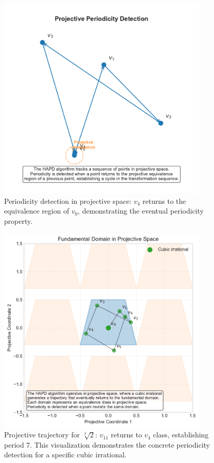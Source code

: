 \begin{theorem}
\begin{figure}[htbp]
\centering
\includegraphics[width=0.9\textwidth]{figures/output/projective_periodicity_visualization.pdf}
\caption{Periodicity detection in projective space: $v_4$ returns to the equivalence region of $v_0$, demonstrating the eventual periodicity property.}
\label{fig:projective_visualization}
\end{figure}

\begin{figure}[htbp]
\centering
\includegraphics[width=0.9\textwidth]{figures/projective_space_regions.pdf}
\caption{Projective trajectory for $\sqrt[3]{2}$: $v_{11}$ returns to $v_4$ class, establishing period 7. This visualization demonstrates the concrete periodicity detection for a specific cubic irrational.}
\label{fig:projective_trajectory}
\end{figure}


\end{theorem}
